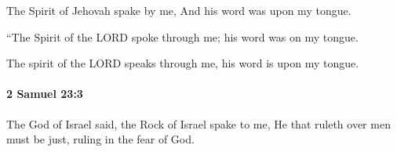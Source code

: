 			\begin{versebox}
					\item[BHS] 
					\item[ASV] The Spirit of Jehovah spake by me, And his word was upon my tongue.
					\item[NIV] “The Spirit of the LORD spoke through me; his word was on my tongue.
					\item[NRSV] The spirit of the LORD speaks through me, his word is upon my tongue.
			\end{versebox}

		\paragraph{2 Samuel 23:3} %
			\label{2SAMUEL-23-3}

			The God of Israel said, the Rock of Israel spake to me, He that ruleth over men must be just, ruling in the fear of God.

